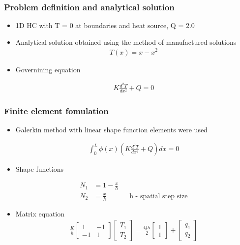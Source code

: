 
\begin{frame}
	\frametitle{Problem definition and analytical solution}
	\begin{itemize}
		\item 1D HC with T = 0 at boundaries and heat source, Q = 2.0
			\vspace{1cm}
		\item Analytical solution obtained using the method of manufactured solutions
			\begin{align*}
				T(x) = x - x^2
			\end{align*}

		\item Governining equation

			\begin{align*}
				K\frac{d^2 T}{d x^2} + Q = 0
			\end{align*}
	\end{itemize}
\end{frame}



\begin{frame}
	\frametitle{Finite element fomulation}
	\begin{itemize}
		\item Galerkin method with linear shape function elements were used

			\begin{align*}
				\int_{0}^{L} \phi(x) \left(K\frac{d^2 T}{d x^2} + Q  \right) dx = 0
			\end{align*}

		\item Shape functions

			\begin{align*}
				N_1 &= 1 - \frac{x}{h} \\
				N_2 &= \frac{x}{h} && \text{h - spatial step size}
			\end{align*}

		\item Matrix equation
			\begin{align*}
				\frac{K}{h} \begin{bmatrix} 1 & -1 \\ -1 & 1 \end{bmatrix} \begin{bmatrix} T_1 \\ T_2 \end{bmatrix} = \frac{Q h}{2} \begin{bmatrix} 1 \\ 1 \end{bmatrix} + \begin{bmatrix} q_1 \\ q_2 \end{bmatrix}
			\end{align*}

	\end{itemize}
\end{frame}

